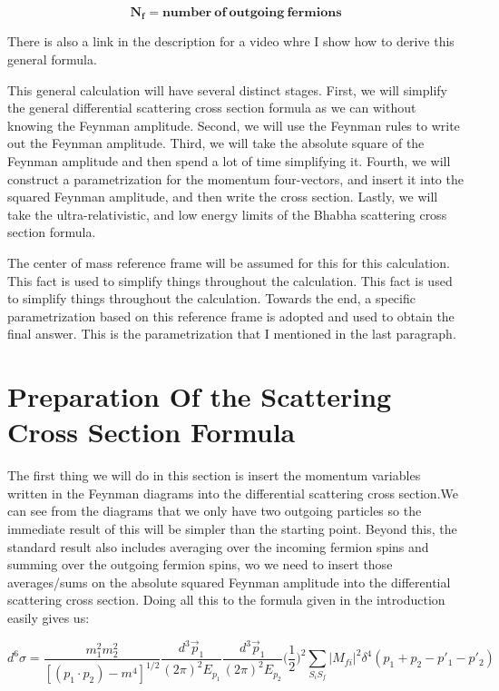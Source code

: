 \documentclass[a4]{article}
\begin{document}
    \[
        \mathbf{N_f = number \: of \: outgoing \: fermions}
    \]

    There is also a link in the description for a video whre I show how to derive this general formula.

    This general calculation will have several distinct stages. First, we will simplify the general differential scattering cross section formula as we can without knowing the Feynman amplitude.
    Second, we will use the Feynman rules to write out the Feynman amplitude. Third, we will take the absolute square of the Feynman amplitude and then spend a lot of time simplifying it. Fourth,
    we will construct a parametrization for the momentum four-vectors, and insert it into the squared Feynman amplitude, and then write the cross section. Lastly, we will take the ultra-relativistic,
    and low energy limits of the Bhabha scattering cross section formula.

    The center of mass reference frame will be assumed for this for this calculation. This fact is used to simplify things throughout the calculation. This fact is used to simplify things throughout
    the calculation. Towards the end, a specific parametrization based on this reference frame is adopted and used to obtain the final answer. This is the parametrization that I mentioned in the last
    paragraph.

    \section*{Preparation Of the Scattering Cross Section Formula}

    The first thing we will do in this section is insert the momentum variables written in the Feynman diagrams into the differential scattering cross section.We can see from the diagrams that we only
    have two outgoing particles so the immediate result of this will be simpler than the starting point. Beyond this, the standard result also includes averaging over the incoming fermion spins and
    summing over the outgoing fermion spins, wo we need to insert those averages/sums on the absolute squared Feynman amplitude into the differential scattering cross section. Doing all this to the
    formula given in the introduction easily gives us:

    \begin{equation}
        d^6 \sigma = \frac{m_1^2 m_2^2}{[(p_1 \cdot p_2) - m^4]^{1/2}} \frac{d^3 \vec{p}_1}{(2 \pi)^2 E_{p_1}} \frac{d^3 \vec{p}_1}{(2 \pi)^2 E_{p_2}} \bigg( \frac{1}{2} \bigg)^2 \sum_{S_i S_f} |M_{fi}|^2 \delta^4 (p_1 + p_2 - p'_1 - p'_2)
    \end{equation}
\end{document}
